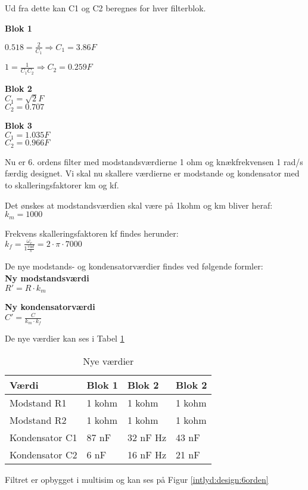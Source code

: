 Ud fra dette kan C1 og C2 beregnes for hver filterblok.

\textbf{Blok 1}

$0.518=\frac { 2 }{ { C }_{ 1 } } \Rightarrow { C }_{ 1 }=3.86F$

$1=\frac { 1 }{ { C }_{ 1 }{ C }_{ 2 } } \Rightarrow { C }_{ 2 }=0.259F$

\textbf{Blok 2}\\
${ C }_{ 1 }=\sqrt { 2 }F$ \\
${ C }_{ 2 }=0.707$ 
 
\textbf{Blok 3}\\
${ C }_{ 1 }=1.035F$ \\
${ C }_{ 2 }=0.966F$  

Nu er 6. ordens filter med modstandsværdierne 1 ohm og knækfrekvensen 1 rad/s færdig designet. 
Vi skal nu skallere værdierne er modstande og kondensator med to skalleringsfaktorer km og kf.

Det ønskes at modstandsværdien skal være på 1kohm og km bliver heraf:\\
${ k }_{ m }=1000$

Frekvens skalleringsfaktoren kf findes herunder:\\
${ k }_{ f }=\frac { { \omega  }_{ c } }{ 1\frac { rad }{ s }  } =2\cdot \pi \cdot 7000$

De nye modstands- og kondensatorværdier findes ved følgende formler:\\
\textbf{Ny modstandsværdi}\\
$R'=R\cdot { k }_{ m }$

\textbf{Ny kondensatorværdi}\\
$C'=\frac { C }{ { k }_{ m }\cdot { k }_{ f } }$ 

De nye værdier kan ses i Tabel \ref{IL:design:values}

\begin{table}[H]
	\caption{Nye værdier }
\begin{center}
    \begin{tabular}{ | l | l | l | l |}
    \hline 
    \textbf{Værdi} 	& \textbf{Blok 1}  &\textbf{Blok 2}	&\textbf{Blok 2}  	\\ \hline
    Modstand R1	 	& 1 kohm   				&1 kohm				&1 kohm				\\ \hline
    Modstand R2 	& 1 kohm  				&1 kohm 			&1 kohm				\\ \hline
    Kondensator C1 			& 87 nF  				&32 nF Hz 				&43 nF 				\\ \hline	
    Kondensator C2 			& 6 nF  				&16 nF Hz 				&21 nF					\\ \hline
    \end{tabular}
\end{center}
	\label{IL:design:values}
\end{table}

Filtret er opbygget i multisim og kan ses på Figur \ref{intlyd:design:6orden}








